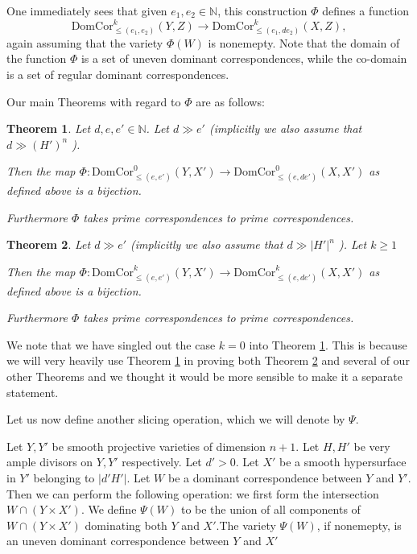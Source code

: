 \documentclass[12pt]{amsart}
\numberwithin{equation}{section}
\newtheorem{theorem}{Theorem}
\numberwithin{theorem}{section}
\theoremstyle{definition}
\theoremstyle{definition}
\def\NN{{\mathbb N}}
\def \DC{{\mathrm{DomCor}}}
\begin{document}
 One immediately sees that given $e_1, e_2 \in \NN$, this construction $\Phi$ defines a function $$\DC^k_{\le (e_1, e_2)}(Y, Z) \to \DC^k_{\le (e_1, de_2)} (X,Z),$$ again assuming that the variety $\Phi(W)$ is nonemepty. Note that the domain of the function $\Phi$ is a set of uneven dominant correspondences, while the co-domain is a set of regular dominant correspondences.


Our main Theorems with regard to $\Phi$ are as follows:

\begin{theorem}\label{main}
    Let $d, e,  e' \in \NN$. Let $d \gg e'$ (implicitly  we also assume that $d \gg (H')^n$ ).

Then the map $\Phi: \DC^0_{\le (e, e')}(Y, X') \to \DC^0_{\le (e, de')} (X,X') $ as defined above is a bijection.  

Furthermore $\Phi$ takes prime correspondences to prime correspondences.
\end{theorem}

\begin{theorem}\label{maink}
    Let $d \gg e'$ (implicitly  we also assume that $d \gg |H'|^n$ ). Let $k \ge 1$

Then the map $\Phi: \DC^k_{\le (e, e')}(Y, X') \to \DC^k_{\le (e, de')} (X,X') $ as defined above is a bijection.  

Furthermore $\Phi$ takes prime correspondences to prime correspondences.
\end{theorem}

We note that we have singled out the case $k=0$ into Theorem \ref{main}. This is because we will very heavily use Theorem \ref{main} in proving both Theorem \ref{maink} and several of our other Theorems and we thought it would be more sensible to make it a separate statement. 

Let us now define another slicing operation, which we will denote by $\Psi$.


Let $Y, Y'$ be smooth projective varieties of dimension $n+1$. Let $H,H'$ be very ample divisors on $Y,Y'$ respectively. Let $d' >0$. Let $X'$ be a smooth hypersurface in $Y'$ belonging to $|d'H'|$. Let $W$ be a dominant correspondence between $Y$ and $Y'$. Then we can perform the following operation: we first form the intersection $W \cap (Y \times X')$. We define $\Psi(W)$ to be the union of all components of $W \cap (Y \times X')$ dominating both $Y$ and $X'$.The variety $\Psi(W)$, if nonemepty, is an uneven dominant correspondence between $Y$ and $X'$
\end{document}
